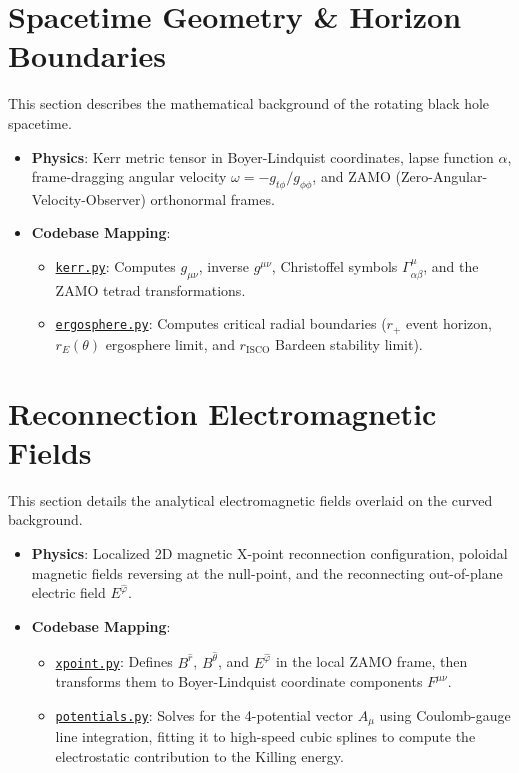 \documentclass[11pt,a4paper]{article}
\begin{document}
\section{Spacetime Geometry \& Horizon Boundaries}
This section describes the mathematical background of the rotating black hole spacetime.
\begin{itemize}
    \item \textbf{Physics}: Kerr metric tensor in Boyer-Lindquist coordinates, lapse function $\alpha$, frame-dragging angular velocity $\omega = -g_{t\phi}/g_{\phi\phi}$, and ZAMO (Zero-Angular-Velocity-Observer) orthonormal frames.
    \item \textbf{Codebase Mapping}:
    \begin{itemize}
        \item \href{file:///Users/vihaa/Desktop/grtp-kerr/grtp/spacetime/kerr.py}{\texttt{kerr.py}}: Computes $g_{\mu\nu}$, inverse $g^{\mu\nu}$, Christoffel symbols $\Gamma^\mu_{\alpha\beta}$, and the ZAMO tetrad transformations.
        \item \href{file:///Users/vihaa/Desktop/grtp-kerr/grtp/spacetime/ergosphere.py}{\texttt{ergosphere.py}}: Computes critical radial boundaries ($r_+$ event horizon, $r_E(\theta)$ ergosphere limit, and $r_{\text{ISCO}}$ Bardeen stability limit).
    \end{itemize}
\end{itemize}

\section{Reconnection Electromagnetic Fields}
This section details the analytical electromagnetic fields overlaid on the curved background.
\begin{itemize}
    \item \textbf{Physics}: Localized 2D magnetic X-point reconnection configuration, poloidal magnetic fields reversing at the null-point, and the reconnecting out-of-plane electric field $E^{\hat{\varphi}}$.
    \item \textbf{Codebase Mapping}:
    \begin{itemize}
        \item \href{file:///Users/vihaa/Desktop/grtp-kerr/grtp/fields/xpoint.py}{\texttt{xpoint.py}}: Defines $B^{\hat{r}}$, $B^{\hat{\theta}}$, and $E^{\hat{\varphi}}$ in the local ZAMO frame, then transforms them to Boyer-Lindquist coordinate components $F^{\mu\nu}$.
        \item \href{file:///Users/vihaa/Desktop/grtp-kerr/grtp/fields/potentials.py}{\texttt{potentials.py}}: Solves for the 4-potential vector $A_\mu$ using Coulomb-gauge line integration, fitting it to high-speed cubic splines to compute the electrostatic contribution to the Killing energy.
    \end{itemize}
\end{itemize}
\end{document}
